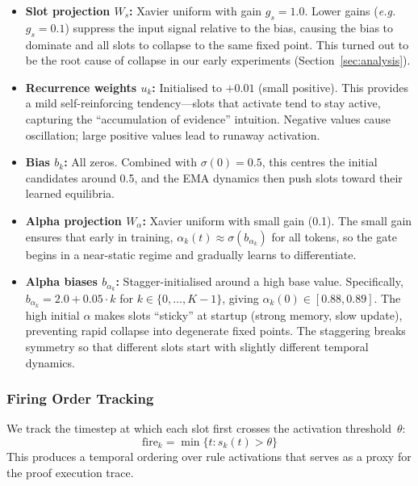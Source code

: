 \documentclass[conference]{IEEEtran}
\newcommand{\eg}{\textit{e.g.}}
\begin{document}
\begin{itemize}[nosep]
    \item \textbf{Slot projection $W_s$:} Xavier uniform with
          gain $g_s = 1.0$. Lower gains (\eg{} $g_s = 0.1$)
          suppress the input signal relative to the bias,
          causing the bias to dominate and all slots to collapse
          to the same fixed point. This turned out to be the root
          cause of collapse in our early experiments
          (Section~\ref{sec:analysis}).
    \item \textbf{Recurrence weights $u_k$:} Initialised to
          $+0.01$ (small positive). This provides a mild
          self-reinforcing tendency---slots that activate tend
          to stay active, capturing the ``accumulation of evidence''
          intuition. Negative values cause oscillation; large
          positive values lead to runaway activation.
    \item \textbf{Bias $b_k$:} All zeros. Combined with
          $\sigma(0) = 0.5$, this centres the initial candidates
          around 0.5, and the EMA dynamics then push slots toward
          their learned equilibria.
    \item \textbf{Alpha projection $W_\alpha$:} Xavier uniform
          with small gain (0.1). The small gain ensures that early
          in training, $\alpha_k(t) \approx \sigma(b_{\alpha_k})$
          for all tokens, so the gate begins in a near-static
          regime and gradually learns to differentiate.
    \item \textbf{Alpha biases $b_{\alpha_k}$:} Stagger-initialised
          around a high base value. Specifically,
          $b_{\alpha_k} = 2.0 + 0.05 \cdot k$ for
$k \in \{0, \ldots, K{-}1\}$, giving
          $\alpha_k(0) \in [0.88, 0.89]$. The high initial
          $\alpha$ makes slots ``sticky'' at startup (strong
          memory, slow update), preventing rapid collapse into
          degenerate fixed points. The staggering breaks symmetry
          so that different slots start with slightly different
          temporal dynamics.
\end{itemize}

\subsubsection{Firing Order Tracking}

We track the timestep at which each slot first crosses the
activation threshold~$\theta$:
\begin{equation}
    \text{fire}_k = \min\{t : s_k(t) > \theta\}
\end{equation}
This produces a temporal ordering over rule activations that
serves as a proxy for the proof execution trace.
\end{document}
